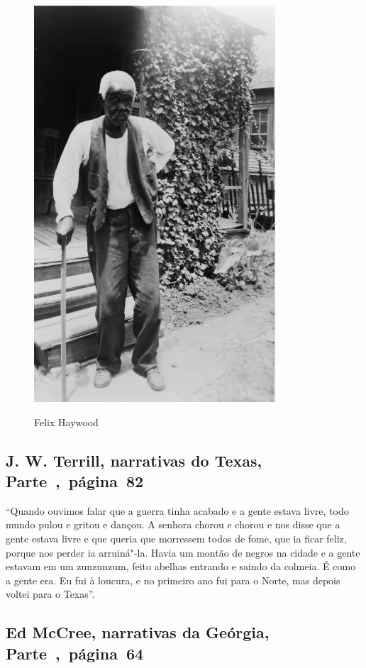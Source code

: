 \pagebreak
\thispagestyle{empty}
\begin{figure}[!ht]
\centering
 \includegraphics[width=90mm]{./imgs/felixhaywood_recorte2.jpg} \label{img21}
\caption{Felix Haywood}
\end{figure}

\subsection{J. W. Terrill, narrativas do Texas, Parte~,~página~82}
\label{ref262}

``Quando ouvimos falar que a guerra tinha acabado e a gente estava
livre, todo mundo pulou e gritou e dançou. A senhora chorou e chorou e
nos disse que a gente estava livre e que queria que morressem todos de
fome, que ia ficar feliz, porque nos perder ia arruiná"-la. Havia um
montão de negros na cidade e a gente estavam em um zunzunzum, feito
abelhas entrando e saindo da colmeia. É como a gente era. Eu fui à
loucura, e no primeiro ano fui para o Norte, mas depois voltei para o
Texas''.

\subsection{Ed McCree, narrativas da Geórgia, Parte~,~página~64}
\label{ref187}

